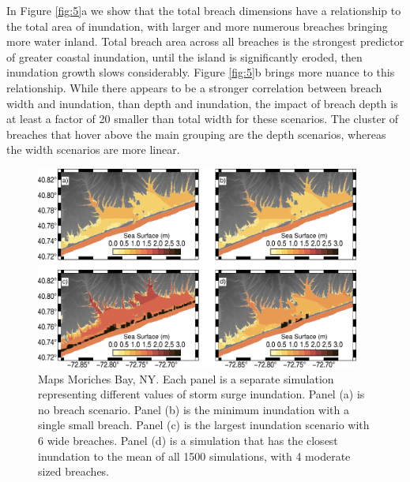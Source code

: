 \documentclass{coastal_paper}
\begin{document}
In Figure \ref{fig:5}a we show that the total breach dimensions have a relationship to the total area of inundation, with larger and more numerous breaches bringing more water inland. Total breach area across all breaches is the strongest predictor of greater coastal inundation, until the island is significantly eroded, then inundation growth slows considerably.
Figure \ref{fig:5}b brings more nuance to this relationship. While there appears to be a stronger correlation between breach width and inundation, than depth and inundation, the impact of breach depth is at least a factor of 20 smaller than total width for these scenarios. The cluster of breaches that hover above the main grouping are the depth scenarios, whereas the width scenarios are more linear.

\begin{figure}
    \centering
    \includegraphics[width=0.95\textwidth]{figures/fig6.pdf}

    \caption{Maps Moriches Bay, NY. Each panel is a separate simulation representing different values of storm surge inundation. Panel (a) is no breach scenario. Panel (b) is the minimum inundation with a single small breach. Panel (c) is the largest inundation scenario with 6 wide breaches. Panel (d)  is a simulation that has the closest inundation to the mean of all 1500 simulations, with 4 moderate sized breaches.}
    \label{fig:6}
\end{figure}
\end{document}
